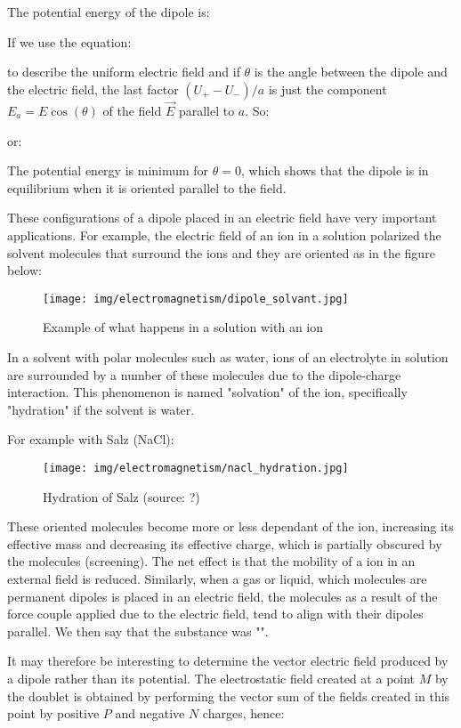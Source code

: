 	The potential energy of the dipole is:
	
	If we use the equation:
	
	to describe the uniform electric field and if $\theta$ is the angle between the dipole and the electric field, the last factor $(U_+ - U_-)/a$ is just the component $E_a=E\cos(\theta)$ of the field $\vec{E}$ parallel to $a$. So:
	
	or:
	
	The potential energy is minimum for $\theta=0$, which shows that the dipole is in equilibrium when it is oriented parallel to the field.

	These configurations of a dipole placed in an electric field have very important applications. For example, the electric field of an ion in a solution polarized the solvent molecules that surround the ions and they are oriented as in the figure below:
	\begin{figure}[H]
		\centering
		\texttt{[image: img/electromagnetism/dipole\_solvant.jpg]}
		\caption{Example of what happens in a solution with an ion}
	\end{figure}
	In a solvent with polar molecules such as water, ions of an electrolyte in solution are surrounded by a number of these molecules due to the dipole-charge interaction. This phenomenon is named "solvation" of the ion, specifically "hydration" if the solvent is water.
	
	For example with Salz (NaCl):
	\begin{figure}[H]
		\centering
		\texttt{[image: img/electromagnetism/nacl\_hydration.jpg]}
		\caption[Hydration of Salz]{Hydration of Salz (source: ?)}
	\end{figure}
	These oriented molecules become more or less dependant of the ion, increasing its effective mass and decreasing its effective charge, which is partially obscured by the molecules (screening). The net effect is that the mobility of a ion in an external field is reduced. Similarly, when a gas or liquid, which  molecules are permanent dipoles is placed in an electric field, the molecules as a result of the force couple applied due to the electric field, tend to align with their dipoles parallel. We then say that the substance was "".

	It may therefore be interesting to determine the vector electric field produced by a dipole rather than its potential. The electrostatic field created at a point $M$ by the doublet is obtained by performing the vector sum of the fields created in this point by positive $P$ and negative $N$ charges, hence:
	

